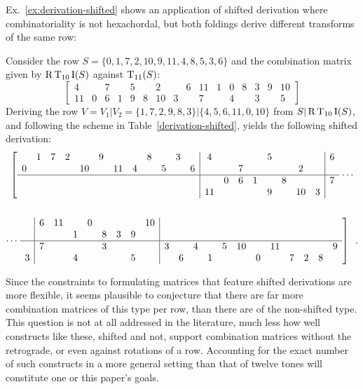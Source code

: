 Ex.~\ref{ex:derivation-shifted} shows an application of shifted derivation where combinatoriality is not hexachordal, but both foldings derive different transforms of the same row:

\begin{example}
    \cite[216]{Starr1984}
    \label{ex:derivation-shifted}
    Consider the row $S = \{ 0, 1, 7, 2, 10, 9, 11, 4, 8, 5, 3, 6 \}$ and the combination matrix given by $\operatorname{R}\operatorname{T}_{10}\operatorname{I}(S)$ against $\operatorname{T}_{11}(S)$:
    \begin{equation}
        \left[
        \begin{array}{cccccccc|cccccccc}
            4 && 7 && 5 && 2 && 6 & 11 & 1 & 0 & 8 & 3 & 9 & 10 \\
            11 & 0 & 6 & 1 & 9 & 8 & 10 & 3 && 7 && 4 && 3 && 5
        \end{array}
        \right]
    \end{equation}
    Deriving the row $V = V_1 | V_2 = \{ 1, 7, 2, 9, 8, 3 \} | \{ 4, 5, 6, 11, 0, 10 \}$ from $S | \operatorname{R}\operatorname{T}_{10}\operatorname{I}(S)$, and following the scheme in Table~\ref{derivation-shifted}, yields the following shifted derivation:
    \begin{multline}
        \left[
        \begin{array}{cccccccccccc|cccccccc|c}
            & 1 & 7 & 2 && 9 &&& 8 && 3 && 4 &&&& 5 &&&& 6 \\
            0 &&&& 10 && 11 & 4 && 5 && 6 & && 7 &&&& 2 && \\
            \hline
            &&&&&&&&&&&& & 0 & 6 & 1 && 8 &&& 7 \\
            &&&&&&&&&&&& 11 &&&& 9 && 10 & 3 &
        \end{array}
        \right. \cdots \\\\
        \cdots \left. \begin{array}{c|cccccccc|cccccccccccc}
            & 6 & 11 && 0 &&&& 10 &&&&&&&&&&& \\
            & && 1 && 8 & 3 & 9 & &&&&&&&&&&& \\
            \hline
            & 7 &&&& 3 &&& & 3 && 4 && 5 & 10 && 11 &&&& 9 \\
            3 &&& 4 &&&& 5 & && 6 && 1 &&& 0 && 7 & 2 & 8
        \end{array} \right] \enspace.
    \end{multline}
\end{example}

Since the constraints to formulating matrices that feature shifted derivations are more flexible, it seems plausible to conjecture that there are far more combination matrices of this type per row, than there are of the non-shifted type. This question is not at all addressed in the literature, much less how well constructs like these, shifted and not, support combination matrices without the retrograde, or even against rotations of a row. Accounting for the exact number of such constructs in a more general setting than that of twelve tones will constitute one or this paper's goals.

